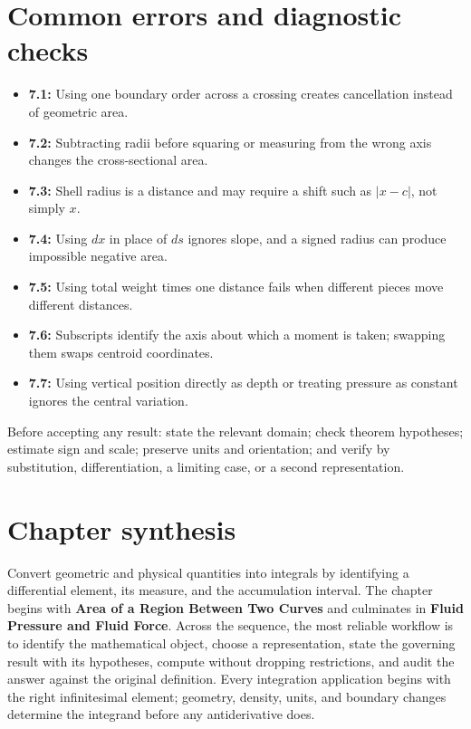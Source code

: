 \documentclass[11pt]{article}
\begin{document}
\section{Common errors and diagnostic checks}
\begin{warningbox}
\begin{itemize}
\item \textbf{7.1:} Using one boundary order across a crossing creates cancellation instead of geometric area.
\item \textbf{7.2:} Subtracting radii before squaring or measuring from the wrong axis changes the cross-sectional area.
\item \textbf{7.3:} Shell radius is a distance and may require a shift such as $|x-c|$, not simply $x$.
\item \textbf{7.4:} Using $dx$ in place of $ds$ ignores slope, and a signed radius can produce impossible negative area.
\item \textbf{7.5:} Using total weight times one distance fails when different pieces move different distances.
\item \textbf{7.6:} Subscripts identify the axis about which a moment is taken; swapping them swaps centroid coordinates.
\item \textbf{7.7:} Using vertical position directly as depth or treating pressure as constant ignores the central variation.
\end{itemize}
\end{warningbox}
\begin{checkbox}
Before accepting any result: state the relevant domain; check theorem hypotheses; estimate sign and scale; preserve units and orientation; and verify by substitution, differentiation, a limiting case, or a second representation.
\end{checkbox}

\section{Chapter synthesis}
Convert geometric and physical quantities into integrals by identifying a differential element, its measure, and the accumulation interval. The chapter begins with \textbf{Area of a Region Between Two Curves} and culminates in \textbf{Fluid Pressure and Fluid Force}. Across the sequence, the most reliable workflow is to identify the mathematical object, choose a representation, state the governing result with its hypotheses, compute without dropping restrictions, and audit the answer against the original definition. Every integration application begins with the right infinitesimal element; geometry, density, units, and boundary changes determine the integrand before any antiderivative does.
\end{document}
